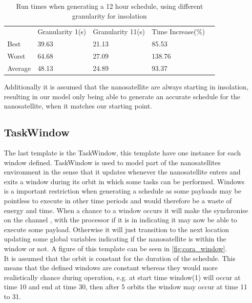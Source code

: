\begin{table}[H]
	\centering
	\begin{tabular}{lllll}
		& Granularity 1(s)           & Granularity 11(s)          & Time Increase(\%)           &  \\ \cline{2-4}
		\multicolumn{1}{l|}{Best}    & \multicolumn{1}{l|}{39.63} & \multicolumn{1}{l|}{21.13} & \multicolumn{1}{l|}{85.53}  &  \\
		\multicolumn{1}{l|}{Worst}   & \multicolumn{1}{l|}{64.68} & \multicolumn{1}{l|}{27.09} & \multicolumn{1}{l|}{138.76} &  \\
		\multicolumn{1}{l|}{Average} & \multicolumn{1}{l|}{48.13} & \multicolumn{1}{l|}{24.89} & \multicolumn{1}{l|}{93.37}  &  \\ \cline{2-4}
	\end{tabular}
		\caption{Run times when generating a 12 hour schedule, using different granularity for insolation}
		\label{tab:runTimes}
\end{table}
		
Additionally it is assumed that the nanosatellite are always starting in insolation, resulting in our model only being able to generate an accurate schedule for the nanosatellite, when it matches our starting point.


\subsection*{TaskWindow}\label{ssec:cora_tw}
The last template is the TaskWindow, this template have one instance for each window defined. TaskWindow is used to model part of the nanosatellites environment in the sense that it updates whenever the nanosatellite enters and exits a window during its orbit in which some tasks can be performed. Windows is a important restriction when generating a schedule as some payloads may be pointless to execute in other time periods and would therefore be a waste of energy and time. When a chance to a window occurs it will make the synchronise on the channel , with the processor if it is in  indicating it may now be able to execute some payload. Otherwise it will just transition to the next location updating some global variables indicating if the nanosatellite is within the window or not. 
A figure of this template can be seen in \cref{fig:cora_window}.\\
It is assumed that the orbit is constant for the duration of the schedule. This means that the defined windows are constant whereas they would more realistically chance during operation, e.g. at start time window(1) will occur at time 10 and end at time 30, then after 5 orbits the window may occur at time 11 to 31.

